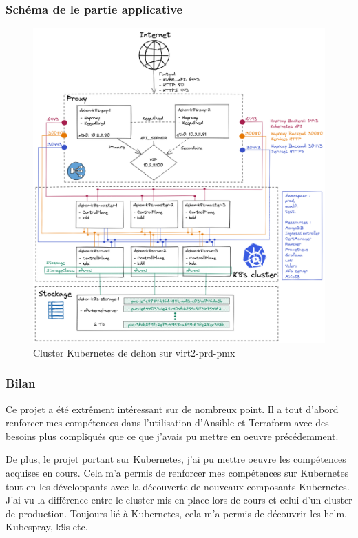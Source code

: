 \documentclass[12pt]{article}
\begin{document}
\subsubsection{Schéma de le partie applicative}
\begin{figure}[!ht]
    \centering
        \includegraphics[width=\textwidth]{src/graph_dehon.png}
    \caption{Cluster \gls{Kubernetes} de dehon sur virt2-prd-pmx}
    \label{fig:graph_dehon}
\end{figure}

\subsubsection{Bilan}
Ce projet a été extrêment intéressant sur de nombreux point.
Il a tout d'abord renforcer mes compétences dans l'utilisation d'\gls{Ansible} et Terraform avec des besoins plus compliqués que ce que j'avais pu mettre en oeuvre précédemment.

De plus, le projet portant sur \gls{Kubernetes}, j'ai pu mettre oeuvre les compétences acquises en cours. 
Cela m'a permis de renforcer mes compétences sur \gls{Kubernetes} tout en les développants avec la découverte de nouveaux composants \gls{Kubernetes}.
J'ai vu la différence entre le \gls{cluster} mis en place lors de cours et celui d'un \gls{cluster} de production.
Toujours lié à \gls{Kubernetes}, cela m'a permis de découvrir les helm, \gls{Kubespray}, k9s etc.
\end{document}
